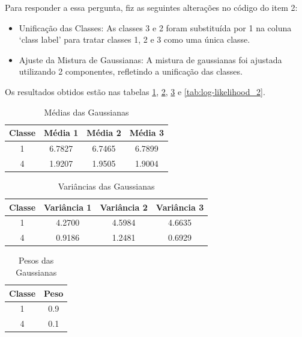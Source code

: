\begin{enumerate}
\begin{tcolorbox}[colback=white, colframe=black, title=Resposta:]
    Para responder a essa pergunta, fiz as seguintes alterações no código do item 2:
    \begin{itemize}
        \item Unificação das Classes: As classes 3 e 2 foram substituída por 1 na coluna `class label' para tratar classes 1, 2 e 3 como uma única classe.
        \item Ajuste da Mistura de Gaussianas: A mistura de gaussianas foi ajustada utilizando 2 componentes, refletindo a unificação das classes.
    \end{itemize}
Os resultados obtidos estão nas tabelas \ref{tab:means_2}, \ref{tab:covariances_2}, \ref{tab:weights_2} e \ref{tab:log-likelihood_2}.
\end{tcolorbox}

\begin{table}[H]
    \centering
    \caption{Médias das Gaussianas}
    \begin{tabular}{|c|c|c|c|}
        \hline
        Classe & Média 1 & Média 2 & Média 3 \\ \hline
        1 & 6.7827 & 6.7465 & 6.7899 \\ \hline
        4 & 1.9207 & 1.9505 & 1.9004 \\ \hline
    \end{tabular}
    \label{tab:means_2}
\end{table}

\begin{table}[H]
    \centering
    \caption{Variâncias das Gaussianas}
    \begin{tabular}{|c|c|c|c|}
        \hline
        Classe & Variância 1 & Variância 2 & Variância 3 \\ \hline
        1 & 4.2700 & 4.5984 & 4.6635 \\ \hline
        4 & 0.9186 & 1.2481 & 0.6929 \\ \hline
    \end{tabular}
    \label{tab:covariances_2}
\end{table}

\begin{table}[H]
    \centering
    \caption{Pesos das Gaussianas}
    \begin{tabular}{|c|c|}
        \hline
        Classe & Peso \\ \hline
        1 & 0.9 \\ \hline
        4 & 0.1 \\ \hline
    \end{tabular}
    \label{tab:weights_2}
\end{table}


\end{enumerate}
